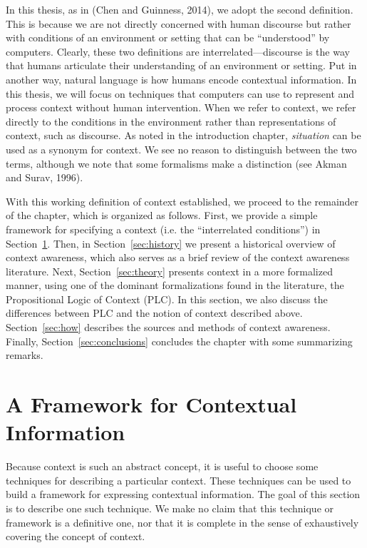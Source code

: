 In this thesis, as in (Chen and Guinness, 2014), we adopt the second definition. This is because we are not directly concerned with human discourse but rather with conditions of an environment or setting that can be ``understood'' by computers. Clearly, these two definitions are interrelated---discourse is the way that humans articulate their understanding of an environment or setting. Put in another way, natural language is how humans encode contextual information. In this thesis, we will focus on techniques that computers can use to represent and process context without human intervention. When we refer to context, we refer directly to the conditions in the environment rather than representations of context, such as discourse. As noted in the introduction chapter, \emph{situation} can be used as a synonym for context. We see no reason to distinguish between the two terms, although we note that some formalisms make a distinction (see Akman and Surav, 1996).

With this working definition of context established, we proceed to the remainder of the chapter, which is organized as follows. First, we provide a simple framework for specifying a context (i.e. the ``interrelated conditions'') in Section~\ref{sec:framework}. Then, in Section~\ref{sec:history} we present a historical overview of context awareness, which also serves as a brief review of the context awareness literature. Next, Section~\ref{sec:theory} presents context in a more formalized manner, using one of the dominant formalizations found in the literature, the Propositional Logic of Context (PLC). In this section, we also discuss the differences between PLC and the notion of context described above. Section~\ref{sec:how} describes the sources and methods of context awareness. Finally, Section~\ref{sec:conclusions} concludes the chapter with some summarizing remarks.

\section{A Framework for Contextual Information}
\label{sec:framework}

Because context is such an abstract concept, it is useful to choose some techniques for describing a particular context. These techniques can be used to build a framework for expressing contextual information. The goal of this section is to describe one such technique. We make no claim that this technique or framework is a definitive one, nor that it is complete in the sense of exhaustively covering the concept of context.

